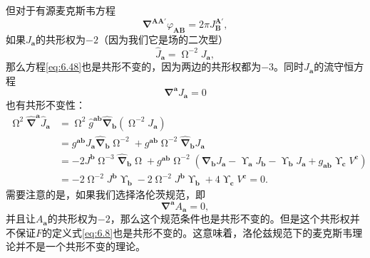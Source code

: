 但对于有源麦克斯韦方程
\begin{equation}
	\mathbf{\nabla }^{\boldsymbol{AA} '} \varphi _{\boldsymbol{AB}} =2\pi J_{\boldsymbol{B}}^{\boldsymbol{A} '} ,
	\label{eq:6.48}
\end{equation}
如果$J_{\boldsymbol{a}}$的共形权为$-2$（因为我们它是场的二次型）
\begin{equation*}
	\hat{J}_{\boldsymbol{a}} =\upOmega^{-2} J_{\boldsymbol{a}} ,
\end{equation*}
那么方程\ref{eq:6.48}也是共形不变的，因为两边的共形权都为$-3$。同时$J_{\boldsymbol{a}}$的流守恒方程
\begin{equation*}
	\mathbf{\nabla }^{\boldsymbol{a}} J_{\boldsymbol{a}} =0
\end{equation*}
也有共形不变性：
\begin{equation*}
	\begin{aligned}
		\upOmega^{2}\hat{\mathbf{\nabla }}^{\boldsymbol{a}}\hat{J}_{\boldsymbol{a}} & =\upOmega^{2}\hat{g}^{\boldsymbol{ab}}\hat{\mathbf{\nabla }}_{\boldsymbol{b}} (\upOmega^{-2} J_{\boldsymbol{a}} )\\
		& =g^{\boldsymbol{ab}} J_{\boldsymbol{a}}\hat{\mathbf{\nabla }}_{\boldsymbol{b}} \upOmega^{-2} +g^{\boldsymbol{ab}} \upOmega^{-2}\hat{\mathbf{\nabla }}_{\boldsymbol{b}} J_{\boldsymbol{a}}\\
		& =-2J^{\boldsymbol{b}} \upOmega^{-3}\hat{\mathbf{\nabla }}_{\boldsymbol{b}} \upOmega+g^{\boldsymbol{ab}} \upOmega^{-2} (\mathbf{\nabla }_{\boldsymbol{b}} J_{\boldsymbol{a}} -\upUpsilon _{\boldsymbol{a}} J_{\boldsymbol{b}} -\upUpsilon _{\boldsymbol{b}} J_{\boldsymbol{a}} +g_{\boldsymbol{ab}} \upUpsilon _{\boldsymbol{c}} V^{\boldsymbol{c}} )\\
		& =-2\upOmega^{-2} J^{\boldsymbol{b}} \upUpsilon _{\boldsymbol{b}} -2\upOmega^{-2} J^{\boldsymbol{b}} \upUpsilon _{\boldsymbol{b}} +4\upUpsilon _{\boldsymbol{c}} V^{\boldsymbol{c}} =0.
	\end{aligned}
\end{equation*}
需要注意的是，如果我们选择洛伦茨规范，即
\begin{equation*}
	\mathbf{\nabla }^{\boldsymbol{a}} A_{\boldsymbol{a}} =0,
\end{equation*}
并且让$A_{\boldsymbol{a}}$的共形权为$-2$，那么这个规范条件也是共形不变的。但是这个共形权并不保证$F$的定义式\ref{eq:6.8}也是共形不变的。这意味着，洛伦兹规范下的麦克斯韦理论并不是一个共形不变的理论。

